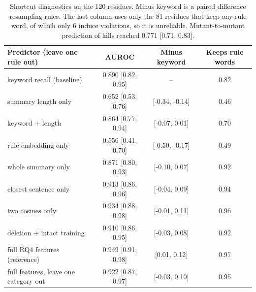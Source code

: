 \begin{table}[t]
\centering\footnotesize\setlength{\tabcolsep}{4pt}
\caption{Shortcut diagnostics on the 120 residues. Minus keyword is a paired difference resampling rules. The last column uses only the 81 residues that keep any rule word, of which only 6 induce violations, so it is unreliable. Mutant-to-mutant prediction of kills reached 0.771 [0.71, 0.83].}\label{tab:shortcuts}
\begin{tabular}{lccc}
\toprule
Predictor (leave one rule out) & AUROC & Minus keyword & Keeps rule words \\
\midrule
keyword recall (baseline) & 0.890 [0.82, 0.95] & -- & 0.82 \\
summary length only & 0.652 [0.53, 0.76] & [-0.34, -0.14] & 0.46 \\
keyword + length & 0.864 [0.77, 0.94] & [-0.07, 0.01] & 0.70 \\
rule embedding only & 0.556 [0.41, 0.70] & [-0.50, -0.17] & 0.49 \\
whole summary only & 0.871 [0.80, 0.93] & [-0.10, 0.07] & 0.92 \\
closest sentence only & 0.913 [0.86, 0.96] & [-0.04, 0.09] & 0.94 \\
two cosines only & 0.934 [0.88, 0.98] & [-0.01, 0.11] & 0.96 \\
deletion + intact training & 0.910 [0.86, 0.95] & [-0.03, 0.08] & 0.92 \\
full RQ4 features (reference) & 0.949 [0.91, 0.98] & [0.01, 0.12] & 0.97 \\
full features, leave one category out & 0.922 [0.87, 0.97] & [-0.03, 0.10] & 0.95 \\
\bottomrule
\end{tabular}
\end{table}
